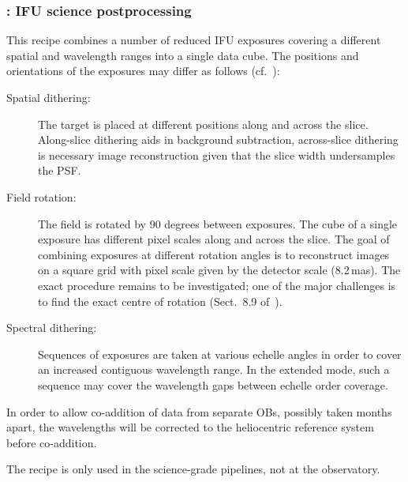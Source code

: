 \clearpage
\subsubsection{: IFU science postprocessing}
\label{sssec:ifu_sci_postprocess}\label{sssec:ifu_postprocess}
\label{rec:metis_ifu_sci_postprocess}
\label{rec:metis_ifu_postprocess}

This recipe combines a number of reduced IFU exposures covering a
different spatial and wavelength ranges into a single data cube. The
positions and orientations of the exposures may differ as follows (cf.~\cite{METIS-operational_concept}): %
\begin{description}
\item[Spatial dithering:] The target is placed at different positions
  along and across the slice. Along-slice dithering aids in background
  subtraction, across-slice dithering is necessary image
  reconstruction given that the slice width undersamples the PSF\@.
\item[Field rotation:] The field is rotated by 90 degrees between
  exposures. The cube of a single exposure has different pixel scales
  along and across the slice. The goal of combining exposures at
  different rotation angles is to reconstruct images on a square grid
  with pixel scale given by the detector scale (8.2\,mas). The exact
  procedure remains to be investigated; one of the major challenges is
  to find the exact centre of rotation
  (Sect.~8.9 of~\cite{DRLS}).
\item[Spectral dithering:] Sequences of exposures are taken at various
  echelle angles in order to cover an increased contiguous wavelength
  range. In the extended mode, such a sequence may cover the
  wavelength gaps between echelle order coverage.
\end{description}

In order to allow co-addition of data from separate OBs, possibly taken
months apart, the wavelengths will be corrected to the heliocentric
reference system before co-addition.

The recipe is only used in the science-grade pipelines, not at the
observatory.

